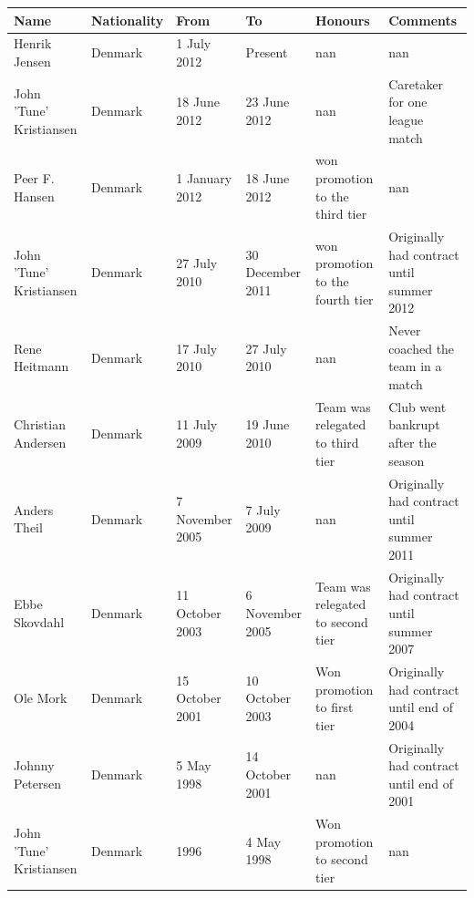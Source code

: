 \documentclass{article}
\begin{document}
\begin{tabular}{llllll}
\toprule
Name & Nationality & From & To & Honours & Comments \\
\midrule
Henrik Jensen & Denmark & 1 July 2012 & Present & nan & nan \\
John 'Tune' Kristiansen & Denmark & 18 June 2012 & 23 June 2012 & nan & Caretaker for one league match \\
Peer F. Hansen & Denmark & 1 January 2012 & 18 June 2012 & won promotion to the third tier & nan \\
John 'Tune' Kristiansen & Denmark & 27 July 2010 & 30 December 2011 & won promotion to the fourth tier & Originally had contract until summer 2012 \\
Rene Heitmann & Denmark & 17 July 2010 & 27 July 2010 & nan & Never coached the team in a match \\
Christian Andersen & Denmark & 11 July 2009 & 19 June 2010 & Team was relegated to third tier & Club went bankrupt after the season \\
Anders Theil & Denmark & 7 November 2005 & 7 July 2009 & nan & Originally had contract until summer 2011 \\
Ebbe Skovdahl & Denmark & 11 October 2003 & 6 November 2005 & Team was relegated to second tier & Originally had contract until summer 2007 \\
Ole Mork & Denmark & 15 October 2001 & 10 October 2003 & Won promotion to first tier & Originally had contract until end of 2004 \\
Johnny Petersen & Denmark & 5 May 1998 & 14 October 2001 & nan & Originally had contract until end of 2001 \\
John 'Tune' Kristiansen & Denmark & 1996 & 4 May 1998 & Won promotion to second tier & nan \\
\bottomrule
\end{tabular}
\end{document}
